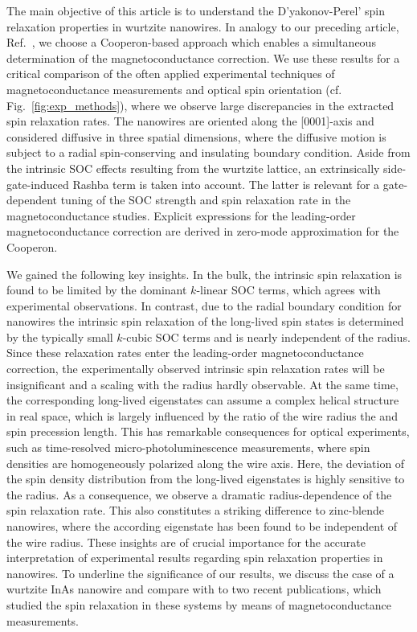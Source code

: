 \documentclass[superscriptaddress,noshowpacs,noshowkeys, twocolumn, floatfix,aps, prb,reprint]{revtex4-1}
\begin{document}
The main objective of this article is to understand the D'yakonov-Perel' spin relaxation properties in wurtzite nanowires. 
In analogy to our preceding article, Ref.~, we choose a Cooperon-based approach which enables a simultaneous determination of the magnetoconductance correction.
We use these results for a critical comparison of the often applied experimental techniques of magnetoconductance measurements and optical spin orientation (cf. Fig.~\ref{fig:exp_methods}), where we observe large discrepancies in the extracted spin relaxation rates.
The nanowires are oriented along the [0001]-axis and considered diffusive in three spatial dimensions, where the diffusive motion is subject to a radial spin-conserving and insulating boundary condition.
Aside from the intrinsic SOC effects resulting from the wurtzite lattice, an extrinsically side-gate-induced Rashba term is taken into account. 
The latter is relevant for a gate-dependent tuning of the SOC strength and spin relaxation rate in the magnetoconductance studies.
Explicit expressions for the leading-order magnetoconductance correction are derived in zero-mode approximation for the Cooperon.

We gained the following key insights.
In the bulk, the intrinsic spin relaxation is found to be limited by the dominant $k$-linear SOC terms, which agrees with experimental observations.\cite{Buss2011,Jahangir2012,Stefanowicz2014}
In contrast, due to the radial boundary condition for nanowires the intrinsic spin relaxation of the long-lived spin states is determined by the typically small $k$-cubic SOC terms and is nearly independent of the radius.
Since these relaxation rates enter the leading-order magnetoconductance correction, the experimentally observed intrinsic spin relaxation rates will be insignificant and a scaling with the radius hardly observable.
At the same time, the corresponding long-lived eigenstates can assume a complex helical structure in real space, which is largely influenced by the ratio of the wire radius the and spin precession length.
This has remarkable consequences for optical experiments, such as time-resolved micro-photoluminescence measurements, where spin densities are homogeneously polarized along the wire axis.\cite{Furthmeier2016} 
Here, the deviation of the spin density distribution from the long-lived eigenstates is highly sensitive to the radius.
As a consequence, we observe a dramatic radius-dependence of the spin relaxation rate.
This also constitutes a striking difference to zinc-blende nanowires, where the according eigenstate has been found to be independent of the wire radius.\cite{Kammermeier2017}
These insights are of crucial importance for the accurate interpretation of experimental results regarding spin relaxation properties in nanowires. 
To underline the significance of our results, we discuss the case of a wurtzite InAs nanowire and compare with to two recent publications,\cite{Scheruebl2016, Jespersen2018} which studied the spin relaxation in these systems by means of magnetoconductance measurements.
\end{document}
